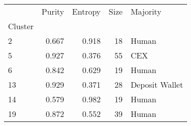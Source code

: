 \begin{tabular}{lrrrl}
\toprule
{} &  Purity &  Entropy &  Size &        Majority \\
Cluster &         &          &       &                 \\
\midrule
2       &   0.667 &    0.918 &    18 &           Human \\
5       &   0.927 &    0.376 &    55 &             CEX \\
6       &   0.842 &    0.629 &    19 &           Human \\
13      &   0.929 &    0.371 &    28 &  Deposit Wallet \\
14      &   0.579 &    0.982 &    19 &           Human \\
19      &   0.872 &    0.552 &    39 &           Human \\
\bottomrule
\end{tabular}
